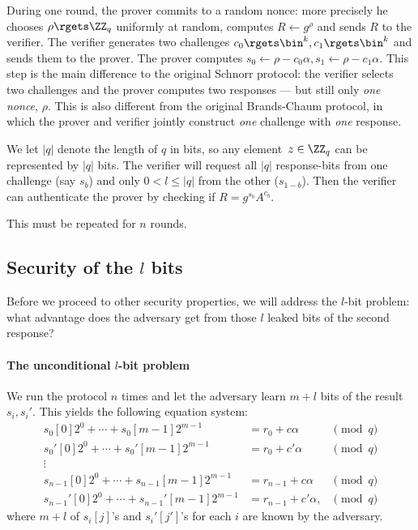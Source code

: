 During one round, the prover commits to a random nonce: more precisely he 
chooses \(
  \rho\rgets \ZZ_q
\) uniformly at random, computes \(
  R\gets g^\rho
\) and sends \(R\) to the verifier.
The verifier generates two challenges \(
  c_0\rgets \bin^k,
  c_1\rgets \bin^k
\) and sends them to the prover.
The prover computes \(
  s_0\gets \rho - c_0\alpha,
  s_1\gets \rho - c_1\alpha.
\)
This step is the main difference to the original Schnorr protocol: the verifier selects two challenges and the prover computes two responses --- but still only \emph{one nonce}, \(\rho\).
This is also different from the original Brands-Chaum protocol, in which the 
prover and verifier jointly construct \emph{one} challenge with \emph{one} 
response.

We let \(|q|\) denote the length of \(q\) in bits, so any element~\(z\in 
\ZZ_q\) can be represented by \(|q|\) bits.
The verifier will request all \(|q|\) response-bits from one challenge (say 
\(s_b\)) and only \(0 < l\leq |q|\) from the other (\(s_{1-b}\)).
Then the verifier can authenticate the prover by checking if \(
  R = g^{s_b}A^{c_b}.
\)

This must be repeated for \(n\) rounds.


\subsection{Security of the \(l\) bits}

Before we proceed to other security properties, we will address the \(l\)-bit 
problem:
what advantage does the adversary get from those \(l\) leaked bits of the 
second response?

\paragraph*{The unconditional \(l\)-bit problem}

We run the protocol \(n\) times and let the adversary learn \(m+l\) bits of the 
result~\(s_i, s_i'\).
This yields the following equation system:
\begin{align*}
  s_0[0]2^0 + \dotsb + s_0[m-1]2^{m-1} &= r_0 + c\alpha &\pmod q\\
  s_0'[0]2^0 + \dotsb + s_0'[m-1]2^{m-1} &= r_0 + c'\alpha &\pmod q\\
  \vdots \\
  s_{n-1}[0]2^0 + \dotsb + s_{n-1}[m-1]2^{m-1} &= r_{n-1} + c\alpha &\pmod q\\
  s_{n-1}'[0]2^0 + \dotsb + s_{n-1}'[m-1]2^{m-1} &= r_{n-1} + c'\alpha, &\pmod 
  q
\end{align*}
where \(m+l\) of \(s_i[j]\)'s and \(s_i'[j']\)'s for each \(i\) are known by 
the adversary.

